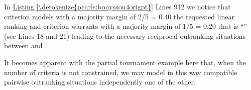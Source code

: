 \documentclass[a4paper,12pt,english]{sphinxhowto}
\begin{document}
\sphinxAtStartPar
In \hyperref[\detokenize{pearls:bouyssou4origpt}]{Listing \ref{\detokenize{pearls:bouyssou4origpt}}} Lines 9\sphinxhyphen{}12 we notice that criterion  models with a majority margin of 2/5 = 0.40 the requested linear ranking and criterion  warrants with a majority margin of 1/5 = 0.20 that  is “”  (see Lines 18 and 21) leading to the necessary reciprocal outranking situations between  and .

\sphinxAtStartPar
It becomes apparent with the partial tournament example here that, when the number of criteria is not constrained, we may model in this way compatible pairwise outranking situations independently one of the other.
\end{document}
